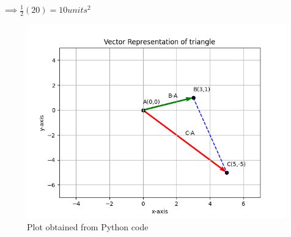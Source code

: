 $
\implies  \frac{1}{2}(20) =10 units^2
$
\begin{figure}[!h]
\centering
\includegraphics[width=\columnwidth]{solutions/2/2/6/image(graph).png}
\caption{Plot obtained from Python code}
\label{2/2/6/Fig:1}
\end{figure}

